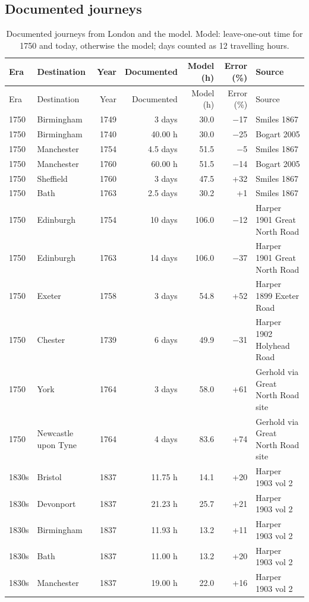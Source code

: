 \documentclass[11pt,a4paper]{article}
\begin{document}
\subsection{Documented journeys}
{\scriptsize\setlength{\tabcolsep}{3pt}\begin{longtable}{llrrrrp{5.2cm}}\caption{Documented journeys from London and the model. Model: leave-one-out time for 1750 and today, otherwise the model; days counted as 12 travelling hours.}\label{tab:docs}\\\toprule Era & Destination & Year & Documented & Model (h) & Error (\%) & Source\\\midrule\endfirsthead \toprule Era & Destination & Year & Documented & Model (h) & Error (\%) & Source\\\midrule\endhead
1750 & Birmingham & 1749 & 3 days & 30.0 & $-$17 & Smiles 1867\\
1750 & Birmingham & 1740 & 40.00 h & 30.0 & $-$25 & Bogart 2005\\
1750 & Manchester & 1754 & 4.5 days & 51.5 & $-$5 & Smiles 1867\\
1750 & Manchester & 1760 & 60.00 h & 51.5 & $-$14 & Bogart 2005\\
1750 & Sheffield & 1760 & 3 days & 47.5 & +32 & Smiles 1867\\
1750 & Bath & 1763 & 2.5 days & 30.2 & +1 & Smiles 1867\\
1750 & Edinburgh & 1754 & 10 days & 106.0 & $-$12 & Harper 1901 Great North Road\\
1750 & Edinburgh & 1763 & 14 days & 106.0 & $-$37 & Harper 1901 Great North Road\\
1750 & Exeter & 1758 & 3 days & 54.8 & +52 & Harper 1899 Exeter Road\\
1750 & Chester & 1739 & 6 days & 49.9 & $-$31 & Harper 1902 Holyhead Road\\
1750 & York & 1764 & 3 days & 58.0 & +61 & Gerhold via Great North Road site\\
1750 & Newcastle upon Tyne & 1764 & 4 days & 83.6 & +74 & Gerhold via Great North Road site\\
1830s & Bristol & 1837 & 11.75 h & 14.1 & +20 & Harper 1903 vol 2\\
1830s & Devonport & 1837 & 21.23 h & 25.7 & +21 & Harper 1903 vol 2\\
1830s & Birmingham & 1837 & 11.93 h & 13.2 & +11 & Harper 1903 vol 2\\
1830s & Bath & 1837 & 11.00 h & 13.2 & +20 & Harper 1903 vol 2\\
1830s & Manchester & 1837 & 19.00 h & 22.0 & +16 & Harper 1903 vol 2\\

\end{longtable}}
\end{document}
